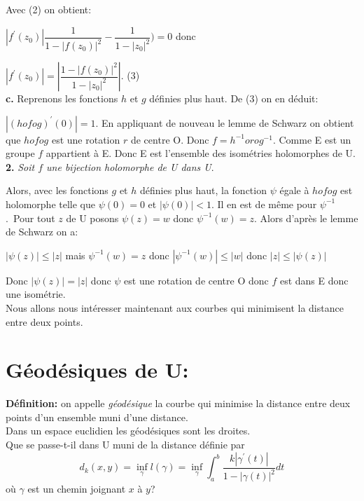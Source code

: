 \documentclass[a4paper, 12pt, twoside]{book}
\begin{document}
  Avec (2) on obtient:\
  
  $|f^{'}(z_{0})|\dfrac{1}{1-|f(z_{0})|^{2}}-\dfrac{1}{1-|z_{0}|^{2}})= 0$ donc
  
  $|f^{'}(z_{0})|=|\dfrac{1-|f(z_{0})|^{2}}{1-|z_{0}|^{2}}|$. (3) \\
  
  \textbf{c.}  Reprenons les fonctions $h$ et $g$ définies plus haut. De (3) on en déduit:\
  
  $|(hofog)^{'}(0)|=1$. En appliquant de nouveau le lemme de Schwarz on obtient que $hofog$ est une rotation $r$ de centre O. Donc $f=h^{-1}orog^{-1}$. Comme E est un groupe $f$ appartient à E. Donc E est l'ensemble des isométries holomorphes de U.\\
  
  \textbf{2.} \textit{ Soit $f$ une bijection holomorphe de U dans U}.\
  
   Alors, avec les fonctions $g$ et $h$ définies plus haut, la fonction $\psi$ égale à $hofog$ est holomorphe telle que $\psi(0)=0$ et $|\psi(0)|<1$. Il en est de même pour $\psi^{-1}$.\
  Pour tout $z$ de U posons $\psi(z)=w$ donc $\psi^{-1}(w)=z$. Alors d'après le lemme de Schwarz on a:\
  
  $|\psi(z)|\leq|z|$ mais  $\psi^{-1}(w)=z$ donc $|\psi^{-1}(w)|\leq|w|$ donc $|z|\leq|\psi(z)|$\
  
  Donc  $|\psi(z)|=|z|$ donc $\psi$ est une rotation de centre O donc $f$ est dans E donc une isométrie.\\
  
  
  
  
  
    
  
  Nous allons nous intéresser maintenant aux courbes qui minimisent la distance entre deux points.\\
  
  \section{Géodésiques de U:}
  
  \textbf{Définition:} on appelle \textit{géodésique} la courbe qui minimise la distance entre deux points d'un ensemble muni d'une distance.\\
  
  Dans un espace euclidien les géodésiques sont les droites.\\
  
  Que se passe-t-il dans U muni de la distance définie par $$d_{k}(x, y)=\inf_{\gamma}l(\gamma)=\inf_{\gamma}\int_{a}^{b} \dfrac{k|\gamma^{'}(t)|}{1-|\gamma(t)|^{2}}dt$$ où $\gamma$ est un chemin joignant $x$ à $y$?\\
  
\end{document}
